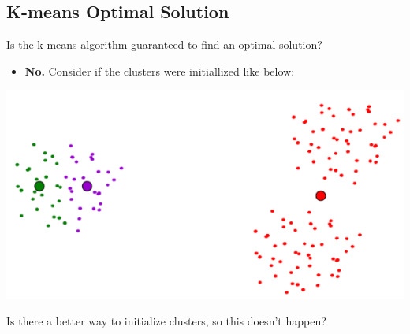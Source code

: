 \documentclass[10pt]{article}
\begin{document}
\subsection*{K-means Optimal Solution}
Is the k-means algorithm guaranteed to find an optimal solution?
\begin{itemize}
    \item \textbf{No.}  Consider if the clusters were initiallized like below:
\end{itemize}
\begin{center}
    \includegraphics[width=\textwidth]{W6_25.png}
\end{center}
Is there a better way to initialize clusters, so this doesn't happen?
\end{document}
